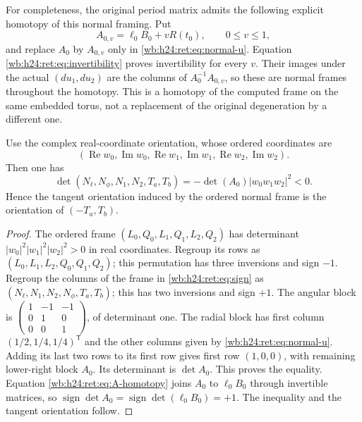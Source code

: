 For completeness, the original period matrix admits the following
explicit homotopy of this normal framing.  Put
\begin{equation}
 A_{0,v}=\ell_0B_0+vR(t_0),\qquad 0\leq v\leq1,
 \label{wb:h24:ret:eq:A-homotopy}
\end{equation}
and replace \(A_0\) by \(A_{0,v}\) only in
\eqref{wb:h24:ret:eq:normal-u}.  Equation \eqref{wb:h24:ret:eq:invertibility} proves
invertibility for every \(v\).  Their images under the actual
\((du_1,du_2)\) are the columns of \(A_0^{-1}A_{0,v}\), so these
are normal frames throughout the homotopy.  This is a homotopy of
the computed frame on the same embedded torus, not a replacement of
the original degeneration by a different one.

\begin{lemma}\label{wb:h24:ret:orientation-lemma}
Use the complex real-coordinate orientation, whose ordered coordinates are
\[
 (\operatorname{Re}w_0,\operatorname{Im}w_0,
  \operatorname{Re}w_1,\operatorname{Im}w_1,
  \operatorname{Re}w_2,\operatorname{Im}w_2).
\]
Then one has
\begin{equation}
 \det(N_\ell,N_\phi,N_1,N_2,T_a,T_b)
       =-\det(A_0)|w_0w_1w_2|^2<0.
 \label{wb:h24:ret:eq:sign}
\end{equation}
Hence the tangent orientation induced by the ordered normal frame is
the orientation of \((-T_a,T_b)\).
\end{lemma}
\begin{proof}
The ordered frame \((L_0,Q_0,L_1,Q_1,L_2,Q_2)\) has determinant
\(|w_0|^2|w_1|^2|w_2|^2>0\) in real coordinates.  Regroup its rows
as \((L_0,L_1,L_2,Q_0,Q_1,Q_2)\); this permutation has three
inversions and sign \(-1\).  Regroup the columns of the frame in
\eqref{wb:h24:ret:eq:sign} as
\((N_\ell,N_1,N_2,N_\phi,T_a,T_b)\); this has two inversions and
sign \(+1\).  The angular block is
\(\left(\begin{smallmatrix}1&-1&-1\\0&1&0\\0&0&1\end{smallmatrix}\right)\),
of determinant one.  The radial block has first column
\((1/2,1/4,1/4)^{\mathsf T}\) and the other columns given by
\eqref{wb:h24:ret:eq:normal-u}.  Adding its last two rows to its first row gives
first row \((1,0,0)\), with remaining lower-right block \(A_0\).
Its determinant is \(\det A_0\).  This proves the equality.
Equation \eqref{wb:h24:ret:eq:A-homotopy} joins \(A_0\) to \(\ell_0B_0\)
through invertible matrices, so
\(\operatorname{sign}\det A_0=\operatorname{sign}\det(\ell_0B_0)=+1\).
The inequality and the tangent orientation follow.
\end{proof}

